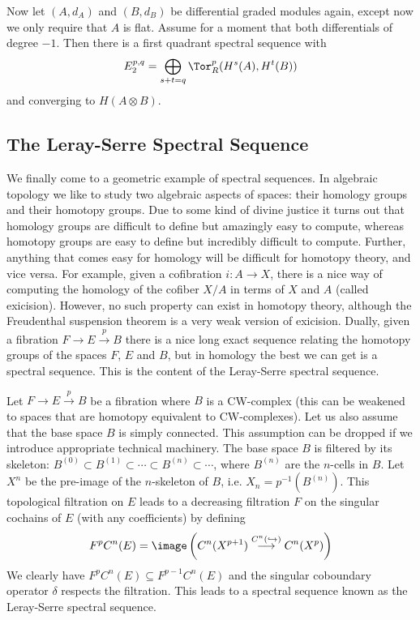 Now let $(A,d_A)$ and $(B,d_B)$ be differential graded modules again, except now we only require that $A$ is flat. Assume for a moment that both differentials of degree $-1$. Then there is a first quadrant spectral sequence with
\[ E_2^{p,q} = \bigoplus_{s+t=q} \Tor_R^p (H^s(A), H^t(B)) \]
and converging to $H(A \otimes B)$.


\subsection{The Leray-Serre Spectral Sequence}

We finally come to a geometric example of spectral sequences. In algebraic topology we like to study two algebraic aspects of spaces: their homology groups and their homotopy groups. Due to some kind of divine justice it turns out that homology groups are difficult to define but amazingly easy to compute, whereas homotopy groups are easy to define but incredibly difficult to compute. Further, anything that comes easy for homology will be difficult for homotopy theory, and vice versa. For example, given a cofibration $i : A \rightarrow X$, there is a nice way of computing the homology of the cofiber $X/A$ in terms of $X$ and $A$ (called exicision). However, no such property can exist in homotopy theory, although the Freudenthal suspension theorem is a very weak version of exicision. Dually, given a fibration $F \rightarrow E \stackrel{p}{\rightarrow} B$ there is a nice long exact sequence relating the homotopy groups of the spaces $F$, $E$ and $B$, but in homology the best we can get is a spectral sequence. This is the content of the Leray-Serre spectral sequence. 

Let $F \rightarrow E \stackrel{p}{\rightarrow} B$ be a fibration where $B$ is a CW-complex (this can be weakened to spaces that are homotopy equivalent to CW-complexes). Let us also assume that the base space $B$ is simply connected. This assumption can be dropped if we introduce appropriate technical machinery. The base space $B$ is filtered by its skeleton: $B^{(0)} \subset B^{(1)} \subset \cdots \subset B^{(n)} \subset \cdots$, where $B^{(n)}$ are the $n$-cells in $B$. Let $X^n$ be the pre-image of the $n$-skeleton of $B$, i.e. $X_n = p^{-1}(B^{(n)})$. This topological filtration on $E$ leads to a decreasing filtration $F$ on the singular cochains of $E$ (with any coefficients) by defining
\[ F^p C^n(E) = \image \left( C^n(X^{p+1}) \stackrel{C^n(\hookrightarrow)}{\longrightarrow} C^n(X^p) \right) \]
We clearly have $F^p C^n(E) \subseteq F^{p-1} C^n(E)$ and the singular coboundary operator $\delta$ respects the filtration. This leads to a spectral sequence known as the Leray-Serre spectral sequence.


